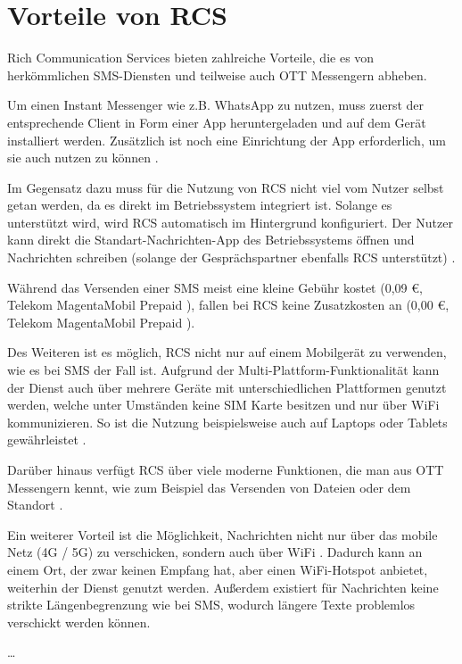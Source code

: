 \documentclass[conference]{IEEEtran}
\begin{document}
\section{Vorteile von RCS}

Rich Communication Services bieten zahlreiche Vorteile, die es von herkömmlichen SMS-Diensten und teilweise auch OTT Messengern abheben.

Um einen Instant Messenger wie z.B. WhatsApp zu nutzen, muss zuerst der entsprechende Client in Form einer App heruntergeladen und auf dem Gerät installiert werden.
Zusätzlich ist noch eine Einrichtung der App erforderlich, um sie auch nutzen zu können \cite{5gmsg,rcsmno}.

Im Gegensatz dazu muss für die Nutzung von RCS nicht viel vom Nutzer selbst getan werden, da es direkt im Betriebssystem integriert ist.
Solange es unterstützt wird, wird RCS automatisch im Hintergrund konfiguriert.
Der Nutzer kann direkt die Standart-Nachrichten-App des Betriebssystems öffnen und Nachrichten schreiben (solange der Gesprächspartner ebenfalls RCS unterstützt) \cite{5gmsg,rcsmno}.

Während das Versenden einer SMS meist eine kleine Gebühr kostet (0,09 €, Telekom MagentaMobil Prepaid \cite{telekomsms}), fallen bei RCS keine Zusatzkosten an (0,00 €, Telekom MagentaMobil Prepaid \cite{telekomrcs}).

Des Weiteren ist es möglich, RCS nicht nur auf einem Mobilgerät zu verwenden, wie es bei SMS der Fall ist.
Aufgrund der Multi-Plattform-Funktionalität kann der Dienst auch über mehrere Geräte mit unterschiedlichen Plattformen genutzt werden, welche unter Umständen keine SIM Karte besitzen und nur über WiFi kommunizieren.
So ist die Nutzung beispielsweise auch auf Laptops oder Tablets gewährleistet \cite{rcsmno,uniprof}.

Darüber hinaus verfügt RCS über viele moderne Funktionen, die man aus OTT Messengern kennt, wie zum Beispiel das Versenden von Dateien oder dem Standort \cite{wafaq,uniprof}.

Ein weiterer Vorteil ist die Möglichkeit, Nachrichten nicht nur über das mobile Netz (4G / 5G) zu verschicken, sondern auch über WiFi \cite{5gmsg}.
Dadurch kann an einem Ort, der zwar keinen Empfang hat, aber einen WiFi-Hotspot anbietet, weiterhin der Dienst genutzt werden.
Außerdem existiert für Nachrichten keine strikte Längenbegrenzung wie bei SMS, wodurch längere Texte problemlos verschickt werden können.

\dots
\end{document}

